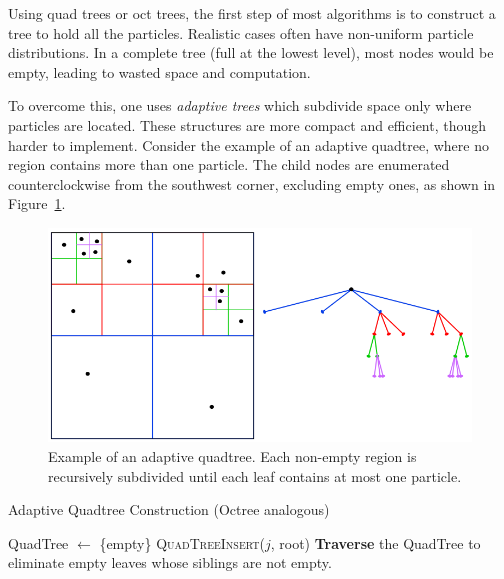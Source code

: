 \documentclass[12pt]{book}
\begin{document}
Using quad trees or oct trees, the first step of most algorithms is to construct a tree to hold all the particles. Realistic cases often have non-uniform particle distributions. In a complete tree (full at the lowest level), most nodes would be empty, leading to wasted space and computation.  

To overcome this, one uses \textit{adaptive trees} which subdivide space only where particles are located. These structures are more compact and efficient, though harder to implement. Consider the example of an adaptive quadtree, where no region contains more than one particle. The child nodes are enumerated counterclockwise from the southwest corner, excluding empty ones, as shown in Figure~\ref{fig:examplquad}.

\begin{figure}[ht]
    \centering
    \includegraphics[width=0.5\linewidth]{images/exampadapquad.png}
    \caption{Example of an adaptive quadtree. Each non-empty region is recursively subdivided until each leaf contains at most one particle.}
    \label{fig:examplquad}
\end{figure}

\begin{algorithm}[H]
\caption{Adaptive Quadtree Construction (Octree analogous)}
\begin{algorithmic}[1]
    \State QuadTree $\gets$ \{empty\}
     
        \State \textsc{QuadTreeInsert}($j$, root) 
    \EndFor
    \State \textbf{Traverse} the QuadTree to eliminate empty leaves whose siblings are not empty. 
\EndProcedure
\end{algorithmic}
\end{algorithm}
\end{document}
